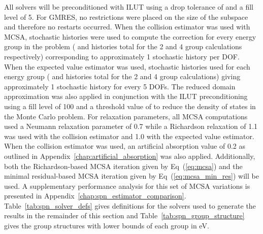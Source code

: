 \documentclass[letterpaper,11pt]{article}
\begin{document}
All solvers will be preconditioned with ILUT using a drop tolerance of
 and a fill level of 5. For GMRES, no restrictions were
placed on the size of the subspace and therefore no restarts
occurred. When the collision estimator was used with MCSA, 
stochastic histories were used to compute the correction for every
energy group in the problem ( and  histories total
for the 2 and 4 group calculations respectively) corresponding to
approximately 1 stochastic history per DOF. When the expected value
estimator was used,  stochastic histories used for each
energy group ( and  histories total for the 2 and
4 group calculations) giving approximately 1 stochastic history for
every 5 DOFs. The reduced domain approximation was also applied in
conjunction with the ILUT preconditioning using a fill level of 100
and a threshold value of  to reduce the density of states
in the Monte Carlo problem. For relaxation parameters, all MCSA
computations used a Neumann relaxation parameter of 0.7 while a
Richardson relaxation of 1.1 was used with the collision estimator and
1.0 with the expected value estimator. When the collision estimator
was used, an artificial absorption value of 0.2 as outlined in
Appendix~\ref{chap:artificial_absorption} was also
applied. Additionally, both the Richardson-based MCSA iteration given
by Eq~(\ref{eq:mcsa}) and the minimal residual-based MCSA iteration
given by Eq~(\ref{eq:mcsa_min_res}) will be used. A supplementary
performance analysis for this set of MCSA variations is presented in
Appendix~\ref{chap:spn_estimator_comparison}. Table~\ref{tab:spn_solver_defs}
gives definitions for the solvers used to generate the results in the
remainder of this section and Table~\ref{tab:spn_group_structure}
gives the group structures with lower bounds of each group in eV.
\end{document}
